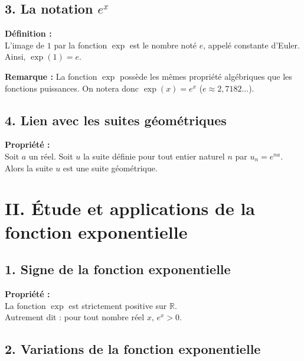\documentclass[11pt,a4paper]{article}
\begin{document}
\subsection*{3. La notation $e^x$}

\begin{mdframed}[style=definitionStyle]
    \textbf{Définition :} ~\\
    L'image de $1$ par la fonction $\exp$ est le nombre noté $e$, appelé constante d'Euler. \\
    Ainsi, $\exp(1)=e$.
\end{mdframed}

\textbf{Remarque :} La fonction $\exp$ possède les mêmes propriété algébriques que les fonctions puissances. On notera donc $\exp(x)=e^x$ ($e\approx2,7182\dots$).

\subsection*{4. Lien avec les suites géométriques}

\begin{mdframed}[style=proprieteStyle]
    \textbf{Propriété :} ~\\
    Soit $a$ un réel. Soit $u$ la suite définie pour tout entier naturel $n$ par $u_n=e^{na}$. \\
    Alors la suite $u$ est une suite géométrique.
\end{mdframed}

\newpage

\section*{II. Étude et applications de la fonction exponentielle}

\subsection*{1. Signe de la fonction exponentielle}

\begin{mdframed}[style=proprieteStyle]
    \textbf{Propriété :} ~\\
    La fonction $\exp$ est strictement positive sur $\mathbb{R}$. \\
    Autrement dit : pour tout nombre réel $x$, $e^x>0$.
\end{mdframed}

\subsection*{2. Variations de la fonction exponentielle}
\end{document}

